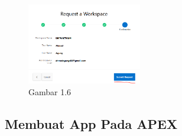 \documentclass{article}
\begin{document}
\begin{itemize}
\begin{figure}[ht]
                \end{figure}
                \begin{figure}[ht]
                    \centerline{\includegraphics[width=5cm]{Capture6.PNG}}
                    \caption{Gambar 1.6}
                \end{figure}
        \end{itemize}
        
    \newpage
    \subsection{Membuat App Pada APEX}
\end{document}
